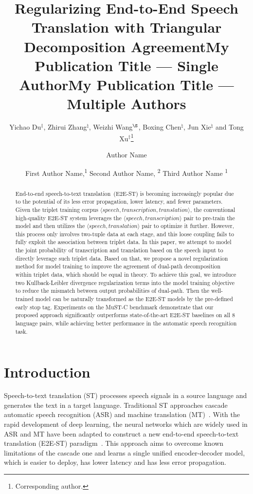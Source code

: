 \documentclass[letterpaper]{article} %
\title{Regularizing End-to-End Speech Translation with Triangular \\ Decomposition Agreement}
\author{
    Yichao Du$^{\ddag}$, Zhirui Zhang$^\natural$, Weizhi Wang$^{\S}$, Boxing Chen$^\natural$, Jun Xie$^\natural$ and Tong Xu$^{\ddag}$\thanks{Corresponding author.}
}
\title{My Publication Title --- Single Author}
\author {
    Author Name
}
\title{My Publication Title --- Multiple Authors}
\author {
    First Author Name,\textsuperscript{\rm 1}
    Second Author Name, \textsuperscript{\rm 2}
    Third Author Name \textsuperscript{\rm 1}
}
\begin{document}
\maketitle

\begin{abstract}

End-to-end speech-to-text translation~(E2E-ST) is becoming increasingly popular due to the potential of its less error propagation, lower latency, and fewer parameters.
Given the triplet training corpus $\langle speech, transcription, translation\rangle$, the conventional high-quality E2E-ST system leverages the $\langle speech, transcription\rangle$ pair to pre-train the model and then utilizes the $\langle speech, translation\rangle$ pair to optimize it further.
However, this process only involves two-tuple data at each stage, and this loose coupling fails to fully exploit the association between triplet data.
In this paper, we attempt to model the joint probability of transcription and translation based on the speech input to directly leverage such triplet data.
Based on that, we propose a novel regularization method for model training to improve the agreement of dual-path decomposition within triplet data, which should be equal in theory.
To achieve this goal, we introduce two Kullback-Leibler divergence regularization terms into the model training objective to reduce the mismatch between output probabilities of dual-path.
Then the well-trained model can be naturally transformed as the E2E-ST models by the pre-defined early stop tag.
Experiments on the MuST-C benchmark demonstrate that our proposed approach significantly outperforms state-of-the-art E2E-ST baselines on all 8 language pairs, while achieving better performance in the automatic speech recognition task.

\end{abstract}

\section{Introduction}
Speech-to-text translation (ST) processes speech signals in a source language and generates the text in a target language.
Traditional ST approaches cascade automatic speech recognition (ASR) and machine translation (MT)~\cite{Ney1999SpeechTC, Sperber2017NeuralLM, Zhang2019LatticeTF, IranzoSnchez2020DirectSM}.
With the rapid development of deep learning, the neural networks which are widely used in ASR and MT have been adapted to construct a new end-to-end speech-to-text translation (E2E-ST) paradigm~\cite{Liu2019EndtoEndST,Wang2020BridgingTG,Dong2021ListenUA}.
This approach aims to overcome known limitations of the cascade one and learns a single unified encoder-decoder model, which is easier to deploy, has lower latency and has less error propagation.
\end{document}
